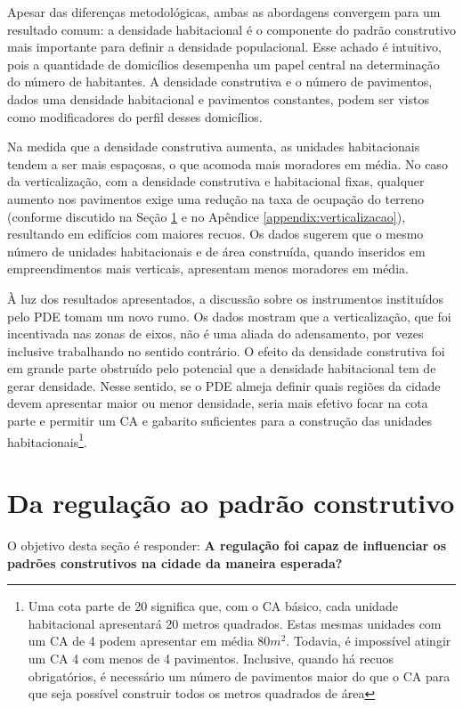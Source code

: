 Apesar das diferenças metodológicas, ambas as abordagens convergem para um resultado comum: a densidade habitacional é o componente do padrão construtivo mais importante para definir a densidade populacional. Esse achado é intuitivo, pois a quantidade de domicílios desempenha um papel central na determinação do número de habitantes. A densidade construtiva e o número de pavimentos, dados uma densidade habitacional e pavimentos constantes, podem ser vistos como modificadores do perfil desses domicílios.

Na medida que a densidade construtiva aumenta, as unidades habitacionais tendem a ser mais espaçosas, o que acomoda mais moradores em média. No caso da verticalização, com a densidade construtiva e habitacional fixas, qualquer aumento nos pavimentos exige uma redução na taxa de ocupação do terreno (conforme discutido na Seção \ref{sec:perg2} e no Apêndice \ref{appendix:verticalizacao}), resultando em edifícios com maiores recuos. Os dados sugerem que o mesmo número de unidades habitacionais e de área construída, quando inseridos em empreendimentos mais verticais, apresentam menos moradores em média. 

À luz dos resultados apresentados, a discussão sobre os instrumentos instituídos pelo PDE tomam um novo rumo. Os dados mostram que a verticalização, que foi incentivada nas zonas de eixos, não é uma aliada do adensamento, por vezes inclusive trabalhando no sentido contrário. O efeito da densidade construtiva foi em grande parte obstruído pelo potencial que a densidade habitacional tem de gerar densidade. Nesse sentido, se o PDE almeja definir quais regiões da cidade devem apresentar maior ou menor densidade, seria mais efetivo focar na cota parte e permitir um CA e gabarito suficientes para a construção das unidades habitacionais\footnote{Uma cota parte de 20 significa que, com o CA básico, cada unidade habitacional apresentará 20 metros quadrados. Estas mesmas unidades com um CA de 4 podem apresentar em média 80$m^2$. Todavia, é impossível atingir um CA 4 com menos de 4 pavimentos. Inclusive, quando há recuos obrigatórios, é necessário um número de pavimentos maior do que o CA para que seja possível construir todos os metros quadrados de área}.  

\section{Da regulação ao padrão construtivo}
\label{sec:perg2}

O objetivo desta seção é responder: \textbf{A regulação foi capaz de influenciar os padrões construtivos na cidade da maneira esperada?}


